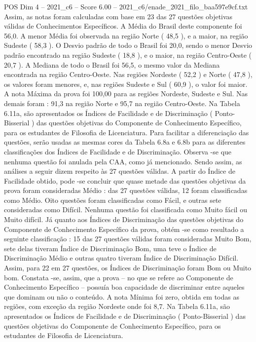 \begin{textsample}{POS Dim 4 – 2021\_c6 – Score 6.00 – 2021\_c6/enade\_2021\_filo\_baa597e9cf.txt}
Assim, as notas foram calculadas com base em 23 das 27 questões objetivas válidas de Conhecimentos Específicos.
A Média do Brasil deste componente foi 56,0.
A menor Média foi observada na região Norte ( 48,5 ), e a maior, na região Sudeste ( 58,3 ).
O Desvio padrão de todo o Brasil foi 20,0, sendo o menor Desvio padrão encontrado na região Sudeste ( 18,8 ), e o maior, na região Centro-Oeste ( 20,7 ).
A Mediana de todo o Brasil foi 56,5, o mesmo valor da Mediana encontrada na região Centro-Oeste.
Nas regiões Nordeste ( 52,2 ) e Norte ( 47,8 ), os valores foram menores, e, nas regiões Sudeste e Sul ( 60,9 ), o valor foi maior.
A nota Máxima da prova foi 100,00 para as regiões Nordeste, Sudeste e Sul.
Nas demais foram : 91,3 na região Norte e 95,7 na região Centro-Oeste.
Na Tabela 6.11a, são apresentados os Índices de Facilidade e de Discriminação ( Ponto-Bisserial ) das questões objetivas do Componente de Conhecimento Específico, para os estudantes de Filosofia de Licenciatura.
Para facilitar a diferenciação das questões, serão usadas as mesmas cores da Tabela 6.8a e 6.8b para as diferentes classificações dos Índices de Facilidade e de Discriminação.
Observa -se que nenhuma questão foi anulada pela CAA, como já mencionado.
Sendo assim, as análises a seguir dizem respeito às 27 questões válidas.
A partir do Índice de Facilidade obtido, pode -se concluir que quase metade das questões objetivas da prova foram consideradas Médio : das 27 questões válidas, 12 foram classificadas como Médio.
Oito questões foram classificadas como Fácil, e outras sete consideradas como Difícil.
Nenhuma questão foi classificada como Muito fácil ou Muito difícil.
Já quanto aos Índices de Discriminação das questões objetivas do Componente de Conhecimento Específico da prova, obtém -se como resultado a seguinte classificação : 15 das 27 questões válidas foram consideradas Muito Bom, sete delas tiveram Índice de Discriminação Bom, uma teve o Índice de Discriminação Médio e outras quatro tiveram Índice de Discriminação Difícil.
Assim, para 22 em 27 questões, os Índices de Discriminação foram Bom ou Muito bom.
Constata -se, assim, que a prova – no que se refere ao Componente de Conhecimento Específico – possuía boa capacidade de discriminar entre aqueles que dominam ou não o conteúdo.
A nota Mínima foi zero, obtida em todas as regiões, com exceção da região Nordeste onde foi 8,7.
Na Tabela 6.11a, são apresentados os Índices de Facilidade e de Discriminação ( Ponto-Bisserial ) das questões objetivas do Componente de Conhecimento Específico, para os estudantes de Filosofia de Licenciatura.

\end{textsample}
